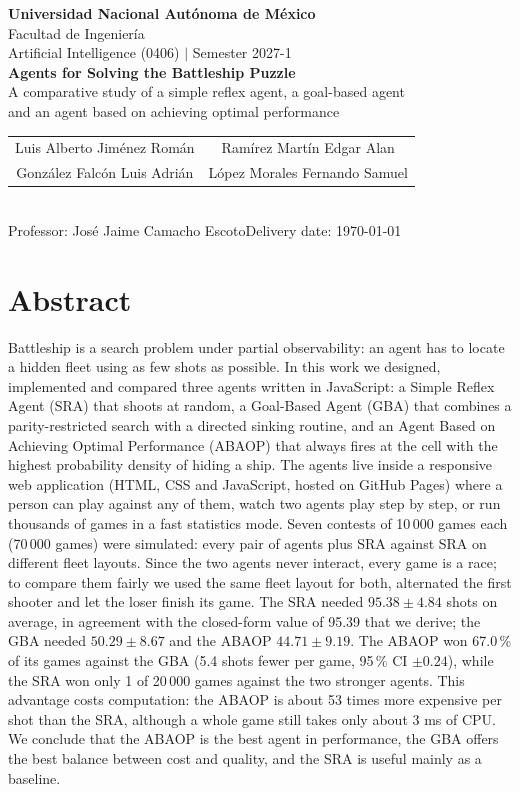\documentclass[letterpaper,11pt]{article} %
\renewcommand{\arraystretch}{1.8}
\newcommand{\todo}[1]{\textcolor{red}{\textbf{[#1]}}}
\newcommand{\semester}{2027-1}
\newcommand{\professor}{Jos\'e Jaime Camacho Escoto}
\newcommand{\studentA}{Luis Alberto Jim\'enez Rom\'an}   \newcommand{\accountA}{\todo{Account no.}}
\newcommand{\studentB}{Ram\'irez Mart\'in Edgar Alan}   \newcommand{\accountB}{\todo{Account no.}}
\newcommand{\studentC}{Gonz\'alez Falc\'on Luis Adri\'an}   \newcommand{\accountC}{\todo{Account no.}}
\newcommand{\studentD}{L\'opez Morales Fernando Samuel}   \newcommand{\accountD}{\todo{Account no.}}
\begin{document}
\vspace*{0.2cm}
\begin{center}
    {\large\textbf{Universidad Nacional Aut\'onoma de M\'exico}}\\[1mm]
    {\large Facultad de Ingenier\'ia}\\[1mm]
    Artificial Intelligence (0406) \quad $|$ \quad Semester \semester\\[6mm]
    {\Huge\bfseries Agents for Solving the Battleship Puzzle}\\[3mm]
    {\large A comparative study of a simple reflex agent, a goal-based agent\\ and an agent based on achieving optimal performance}\\[6mm]
    \renewcommand{\arraystretch}{1.5}
    \begin{tabular}{cc}
        \studentA & \studentB \\
        \studentC & \studentD \\
    \end{tabular}\\[3mm]
    Professor: \professor \qquad Delivery date: \today
\end{center}
\renewcommand{\arraystretch}{1.8}

\vspace{2mm}
\section*{Abstract}

Battleship is a search problem under partial observability: an agent has to locate a hidden fleet using as few shots as possible.
In this work we designed, implemented and compared three agents written in JavaScript: a Simple Reflex Agent (SRA) that shoots at random,
a Goal-Based Agent (GBA) that combines a parity-restricted search with a directed sinking routine, and an Agent Based on Achieving Optimal
Performance (ABAOP) that always fires at the cell with the highest probability density of hiding a ship.
The agents live inside a responsive web application (HTML, CSS and JavaScript, hosted on GitHub Pages) where a person can play against any of them,
watch two agents play step by step, or run thousands of games in a fast statistics mode.
Seven contests of 10\,000 games each (70\,000 games) were simulated: every pair of agents plus SRA against SRA on different fleet layouts.
Since the two agents never interact, every game is a race; to compare them fairly we used the same fleet layout for both, alternated the first shooter and let the loser finish its game.
The SRA needed $95.38\pm4.84$ shots on average, in agreement with the closed-form value of 95.39 that we derive; the GBA needed $50.29\pm8.67$ and the ABAOP $44.71\pm9.19$.
The ABAOP won 67.0\,\% of its games against the GBA (5.4 shots fewer per game, 95\,\% CI $\pm0.24$), while the SRA won only 1 of 20\,000 games against the two stronger agents.
This advantage costs computation: the ABAOP is about 53 times more expensive per shot than the SRA, although a whole game still takes only about 3 ms of CPU.
We conclude that the ABAOP is the best agent in performance, the GBA offers the best balance between cost and quality, and the SRA is useful mainly as a baseline.
\end{document}
